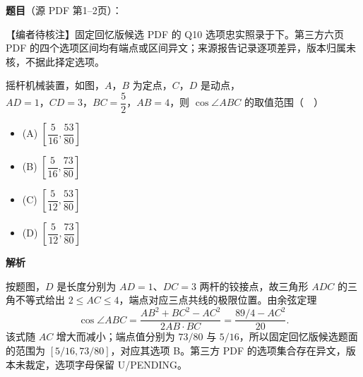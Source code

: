 \begin{answer}

\textbf{题目}（源 PDF 第1–2页）：

\begin{gktip}
【编者待核注】固定回忆版候选 PDF 的 Q10 选项忠实照录于下。第三方六页 PDF 的四个选项区间均有端点或区间异文；来源报告记录逐项差异，版本归属未核，不据此择定选项。
\end{gktip}

摇杆机械装置，如图，\(A，B\) 为定点，\(C，D\) 是动点，\(AD=1，CD=3，BC=\dfrac{5}{2}，AB=4\)，则 \(\cos\angle ABC\) 的取值范围（　）
\nopagebreak[4]
\begin{center}\end{center}
\nopagebreak[4]
\begin{itemize}
\item (A) \(\left[\dfrac{5}{16},\dfrac{53}{80}\right]\)
\item (B) \(\left[\dfrac{5}{16},\dfrac{73}{80}\right]\)
\item (C) \(\left[\dfrac{5}{12},\dfrac{53}{80}\right]\)
\item (D) \(\left[\dfrac{5}{12},\dfrac{73}{80}\right]\)
\end{itemize}

\textbf{解析}

按题图，\(D\) 是长度分别为 \(AD=1\)、\(DC=3\) 两杆的铰接点，故三角形 \(ADC\) 的三角不等式给出 \(2\le AC\le4\)，端点对应三点共线的极限位置。由余弦定理
\nopagebreak[4]
\[
\cos\angle ABC
=\frac{AB^2+BC^2-AC^2}{2AB\cdot BC}
=\frac{89/4-AC^2}{20}.
\]
该式随 \(AC\) 增大而减小；端点值分别为 \(73/80\) 与 \(5/16\)，所以固定回忆版候选题面的范围为 \([5/16,73/80]\)，对应其选项 B。第三方 PDF 的选项集合存在异文，版本未裁定，选项字母保留 U/PENDING。


\end{answer}

